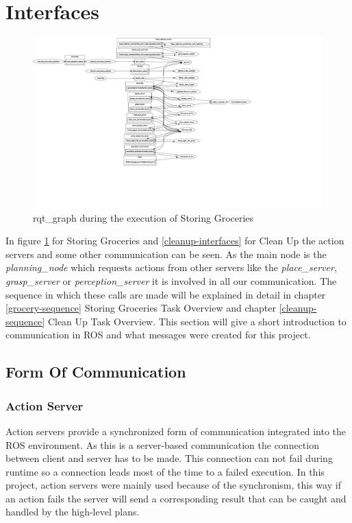 \documentclass[main.tex]{subfiles}
\begin{document}
		\section{Interfaces}
		\begin{figure}[H]
			\centering
			\includegraphics[width=1.5\textwidth]{pictures/diagramms/rqt_interfaces_grocery_vertical}
			\caption{rqt\_graph during the execution of Storing Groceries}
			\label{interfaces}
		\end{figure}

		In figure \ref{interfaces} for Storing Groceries and \ref{cleanup-interfaces} for Clean Up the action servers and some other communication can be seen. As the main node is the \textit{planning\_node} which requests actions from other servers like the \textit{place\_server}, \textit{grasp\_server} or \textit{perception\_server} it is involved in all our communication. The sequence in which these calls are made will be explained in detail in chapter \ref{grocery-sequence} Storing Groceries Task Overview and chapter \ref{cleanup-sequence} Clean Up Task Overview. This section will give a short introduction to communication in ROS and what messages were created for this project.

		\subsection{Form Of Communication}
		
			\subsubsection{Action Server}
			
			Action servers provide a synchronized form of communication integrated into the ROS environment. As this is a server-based communication the connection between client and server has to be made. This connection can not fail during runtime so a connection leads most of the time to a failed execution. In this project, action servers were mainly used because of the synchronism, this way if an action fails the server will send a corresponding result that can be caught and handled by the high-level plans.
			
\end{document}
